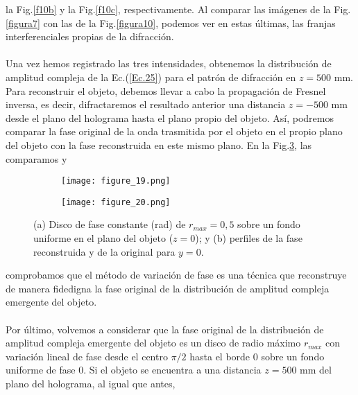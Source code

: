 \documentclass[12pt]{article}
\begin{document}
la Fig.\ref{f10b} y  la Fig.\ref{f10c}, respectivamente. Al comparar las imágenes de la Fig.\ref{figura7} con las de la Fig.\ref{figura10}, podemos ver en estas últimas, las franjas interferenciales propias de la difracción.\\ \\
Una vez hemos registrado las tres intensidades, obtenemos la distribución de amplitud compleja de la Ec.(\ref{Ec.25}) para el patrón de difracción en $z = 500$ mm. Para reconstruir el objeto, debemos llevar a cabo la propagación de Fresnel inversa, es decir, difractaremos el resultado anterior una distancia $ z = -500$ mm desde el plano del holograma hasta el plano propio del objeto. Así,  podremos comparar la fase original de la onda trasmitida por el objeto en el propio plano del objeto con la fase reconstruida en este mismo plano. En la Fig.\ref{figura11}, las comparamos y
\begin{figure}[b!]
\centering
\begin{center}
    \begin{subfigure}[b]{0.45\textwidth}
        \texttt{[image: figure\_19.png]}
        \caption{}
        \label{f11a}
    \end{subfigure}
    \hspace{10pt}
    \begin{subfigure}[b]{0.45\textwidth}
        \texttt{[image: figure\_20.png]}
        \caption{}
        \label{f11b}
    \end{subfigure}
  \caption{(a) Disco de fase constante (rad) de $r_{max}=0,5$ sobre un fondo uniforme en el plano del objeto ($z=0$);  y (b) perfiles de la fase reconstruida y  de la original para $y = 0$.}
  \label{figura11}
\end{center}
\end{figure}
comprobamos que el método de variación de fase es una técnica que reconstruye de manera fidedigna la fase original de la distribución de amplitud compleja emergente del objeto.\\ \\
Por último, volvemos a considerar que la fase original de la distribución de amplitud compleja emergente del objeto es un disco de radio máximo $r_{max}$ con variación lineal de fase desde el centro $\pi/2$ hasta el borde $0$ sobre un fondo uniforme de fase $0$.  Si el objeto se encuentra a una distancia $z = 500$ mm del plano del holograma, al igual que antes,
\end{document}
